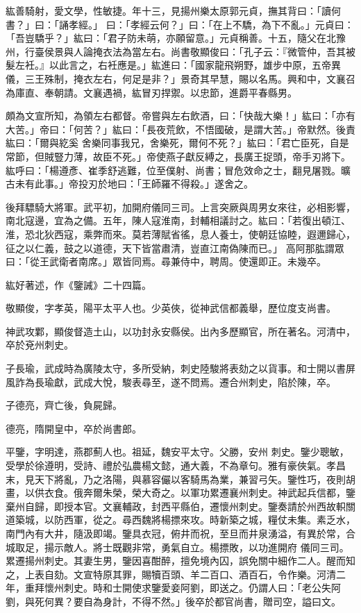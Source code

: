 \begin{pinyinscope}
 紘善騎射，愛文學，性敏捷。年十三，見揚州樂太原郭元貞，撫其背曰：「讀何書？」曰：「誦孝經。」
 曰：「孝經云何？」曰：「在上不驕，為下不亂。」元貞曰：「吾豈驕乎？」紘曰：「君子防未萌，亦願留意。」元貞稱善。十五，隨父在北豫州，行臺侯景與人論掩衣法為當左右。尚書敬顯俊曰：「孔子云：『微管仲，吾其被髮左衽。』以此言之，右衽應是。」紘進曰：「國家龍飛朔野，雄步中原，五帝異儀，三王殊制，掩衣左右，何足是非？」景奇其早慧，賜以名馬。興和中，文襄召為庫直、奉朝請。文襄遇禍，紘冒刃捍禦。以忠節，進爵平春縣男。



 頗為文宣所知，為領左右都督。帝嘗與左右飲酒，曰：「快哉大樂！」紘曰：「亦有大苦。」帝曰：「何苦？」紘曰：「長夜荒飲，不悟國破，是謂大苦。」帝默然。後責紘曰：「爾與紇奚
 舍樂同事我兄，舍樂死，爾何不死？」紘曰：「君亡臣死，自是常節，但賊豎力薄，故臣不死。」帝使燕子獻反縛之，長廣王捉頭，帝手刃將下。紘呼曰：「楊遵彥、崔季舒逃難，位至僕射、尚書；冒危效命之士，翻見屠戮。曠古未有此事。」帝投刃於地曰：「王師羅不得殺。」遂舍之。



 後拜驃騎大將軍。武平初，加開府儀同三司。上言突厥與周男女來往，必相影響，南北寇邊，宜為之備。五年，陳人寇淮南，封輔相議討之。紘曰：「若復出頓江、淮，恐北狄西寇，乘弊而來。莫若薄賦省徭，息人養士，使朝廷協睦，遐邇歸心，征之以仁義，鼓之以道德，天下皆當肅清，豈直江南偽陳而已。」
 高阿那肱謂眾曰：「從王武衛者南席。」眾皆同焉。尋兼侍中，聘周。使還即正。未幾卒。



 紘好著述，作《鑒誡》二十四篇。



 敬顯俊，字孝英，陽平太平人也。少英俠，從神武信都義舉，歷位度支尚書。



 神武攻鄴，顯俊督造土山，以功封永安縣侯。出內多歷顯官，所在著名。河清中，卒於兗州刺史。



 子長瑜，武成時為廣陵太守，多所受納，刺史陸駿將表劾之以貨事。和士開以書屏風詐為長瑜獻，武成大悅，駿表尋至，遂不問焉。遷合州刺史，陷於陳，卒。



 子德亮，齊亡後，負屍歸。



 德亮，隋開皇中，卒於尚書郎。



 平鑒，字明達，燕郡薊人也。祖延，魏安平太守。父勝，安州
 刺史。鑒少聰敏，受學於徐遵明，受詩、禮於弘農楊文懿，通大義，不為章句。雅有豪俠氣。孝昌末，見天下將亂，乃之洛陽，與慕容儼以客騎馬為業，兼習弓矢。鑒性巧，夜則胡畫，以供衣食。俄奔爾朱榮，榮大奇之。以軍功累遷襄州刺史。神武起兵信都，鑒棄州自歸，即授本官。文襄輔政，封西平縣伯，遷懷州刺史。鑒奏請於州西故軹關道築城，以防西軍，從之。尋西魏將楊摽來攻。時新築之城，糧仗未集。素乏水，南門內有大井，隨汲即竭。鑒具衣冠，俯井而祝，至旦而井泉湧溢，有異於常，合城取足，揚示敵人。將士既觀非常，勇氣自立。楊摽敗，以功進開府
 儀同三司。累遷揚州刺史。其妻生男，鑒因喜酣醉，擅免境內囚，誤免關中細作二人。醒而知之，上表自劾。文宣特原其罪，賜犢百頭、羊二百口、酒百石，令作樂。河清二年，重拜懷州刺史。時和士開使求鑒愛妾阿劉，即送之。仍謂人曰：「老公失阿劉，與死何異？要自為身計，不得不然。」後卒於都官尚書，贈司空，謚曰文。




\end{pinyinscope}
